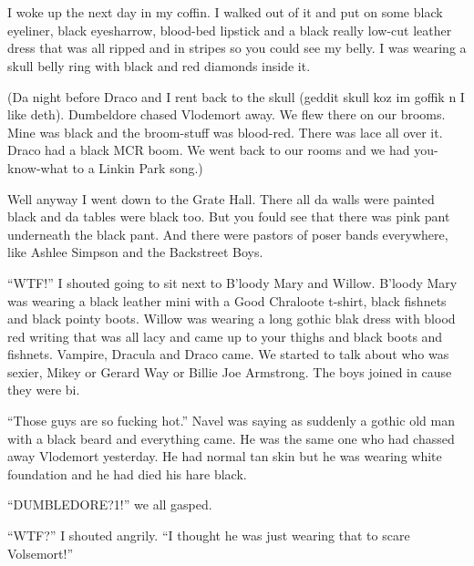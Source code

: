 \section{}



I woke up the next day in my coffin. I walked out of it and put on some black eyeliner, black eyesharrow, blood-bed lipstick and a black really low-cut leather dress that was all ripped and in stripes so you could see my belly. I was wearing a skull belly ring with black and red diamonds inside it.

(Da night before Draco and I rent back to the skull (geddit skull koz im goffik n I like deth). Dumbeldore chased Vlodemort away. We flew there on our brooms. Mine was black and the broom-stuff was blood-red. There was lace all over it. Draco had a black MCR boom. We went back to our rooms and we had you-know-what to a Linkin Park song.)

Well anyway I went down to the Grate Hall. There all da walls were painted black and da tables were black too. But you fould see that there was pink pant underneath the black pant. And there were pastors of poser bands everywhere, like Ashlee Simpson and the Backstreet Boys.

\enquote{WTF\@!} I shouted going to sit next to B'loody Mary and Willow. B'loody Mary was wearing a black leather mini with a Good Chraloote t-shirt, black fishnets and black pointy boots. Willow was wearing a long gothic blak dress with blood red writing that was all lacy and came up to your thighs and black boots and fishnets. Vampire, Dracula and Draco came. We started to talk about who was sexier, Mikey or Gerard Way or Billie Joe Armstrong. The boys joined in cause they were bi.

\enquote{Those guys are so fucking hot.} Navel was saying as suddenly a gothic old man with a black beard and everything came. He was the same one who had chassed away Vlodemort yesterday. He had normal tan skin but he was wearing white foundation and he had died his hare black.

\enquote{\dotfill DUMBLEDORE\@?1\@!} we all gasped.

\enquote{WTF\@?} I shouted angrily. \enquote{I thought he was just wearing that to scare Volsemort!}

